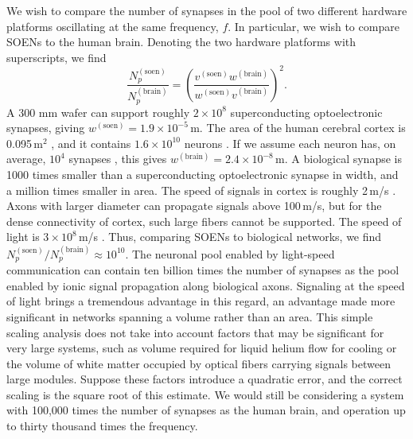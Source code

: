 \documentclass[twocolumn]{article}
\begin{document}
We wish to compare the number of synapses in the pool of two different hardware platforms oscillating at the same frequency, $f$. In particular, we wish to compare SOENs to the human brain. Denoting the two hardware platforms with superscripts, we find
\begin{equation}
\label{eq:neuronalPool_number}
\frac{N_p^{(\mathrm{soen})}}{N_p^{(\mathrm{brain})}} = \left(\frac{v^{(\mathrm{soen})}w^{(\mathrm{brain})}}{w^{(\mathrm{soen})}v^{(\mathrm{brain})}}\right)^2.
\end{equation}
A 300 mm wafer can support roughly $2\times 10^8$ superconducting optoelectronic synapses, giving $w^{(\mathrm{soen})} = 1.9\times10^{-5}$\,m. The area of the human cerebral cortex is 0.095\,m$^2$ \cite{scva2014}, and it contains $1.6\times 10^{10}$ neurons \cite{azca2009,he2009}. If we assume each neuron has, on average, $10^4$ synapses \cite{brsc1998}, this gives $w^{(\mathrm{brain})} = 2.4\times 10^{-8}$\,m. A biological synapse is 1000 times smaller than a superconducting optoelectronic synapse in width, and a million times smaller in area. The speed of signals in cortex is roughly 2\,m/s \cite{edve2004}. Axons with larger diameter can propagate signals above 100\,m/s, but for the dense connectivity of cortex, such large fibers cannot be supported. The speed of light is $3\times 10^8$\,m/s \cite{speedOfLight}. Thus, comparing SOENs to biological networks, we find $N_p^{(\mathrm{soen})}/N_p^{(\mathrm{brain})} \approx 10^{10}$. The neuronal pool enabled by light-speed communication can contain ten billion times the number of synapses as the pool enabled by ionic signal propagation along biological axons. Signaling at the speed of light brings a tremendous advantage in this regard, an advantage made more significant in networks spanning a volume rather than an area. This simple scaling analysis does not take into account factors that may be significant for very large systems, such as volume required for liquid helium flow for cooling or the volume of white matter occupied by optical fibers carrying signals between large modules. Suppose these factors introduce a quadratic error, and the correct scaling is the square root of this estimate. We would still be considering a system with 100,000 times the number of synapses as the human brain, and operation up to thirty thousand times the frequency.
\end{document}
